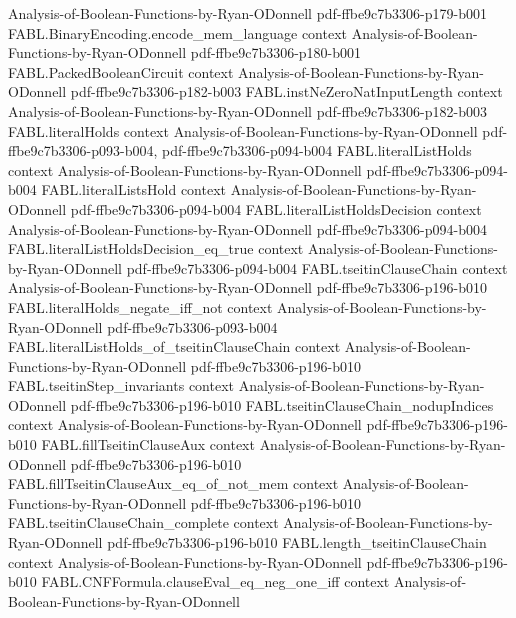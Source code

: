 \begin{theorem}
  {Analysis-of-Boolean-Functions-by-Ryan-ODonnell}
  {pdf-ffbe9c7b3306-p179-b001}
\proofstep
  {FABL.BinaryEncoding.encode_mem_language}
  {context}
  {Analysis-of-Boolean-Functions-by-Ryan-ODonnell}
  {pdf-ffbe9c7b3306-p180-b001}
\proofstep
  {FABL.PackedBooleanCircuit}
  {context}
  {Analysis-of-Boolean-Functions-by-Ryan-ODonnell}
  {pdf-ffbe9c7b3306-p182-b003}
\proofstep
  {FABL.instNeZeroNatInputLength}
  {context}
  {Analysis-of-Boolean-Functions-by-Ryan-ODonnell}
  {pdf-ffbe9c7b3306-p182-b003}
\proofstep
  {FABL.literalHolds}
  {context}
  {Analysis-of-Boolean-Functions-by-Ryan-ODonnell}
  {pdf-ffbe9c7b3306-p093-b004,
    pdf-ffbe9c7b3306-p094-b004}
\proofstep
  {FABL.literalListHolds}
  {context}
  {Analysis-of-Boolean-Functions-by-Ryan-ODonnell}
  {pdf-ffbe9c7b3306-p094-b004}
\proofstep
  {FABL.literalListsHold}
  {context}
  {Analysis-of-Boolean-Functions-by-Ryan-ODonnell}
  {pdf-ffbe9c7b3306-p094-b004}
\proofstep
  {FABL.literalListHoldsDecision}
  {context}
  {Analysis-of-Boolean-Functions-by-Ryan-ODonnell}
  {pdf-ffbe9c7b3306-p094-b004}
\proofstep
  {FABL.literalListHoldsDecision_eq_true}
  {context}
  {Analysis-of-Boolean-Functions-by-Ryan-ODonnell}
  {pdf-ffbe9c7b3306-p094-b004}
\proofstep
  {FABL.tseitinClauseChain}
  {context}
  {Analysis-of-Boolean-Functions-by-Ryan-ODonnell}
  {pdf-ffbe9c7b3306-p196-b010}
\proofstep
  {FABL.literalHolds_negate_iff_not}
  {context}
  {Analysis-of-Boolean-Functions-by-Ryan-ODonnell}
  {pdf-ffbe9c7b3306-p093-b004}
\proofstep
  {FABL.literalListHolds_of_tseitinClauseChain}
  {context}
  {Analysis-of-Boolean-Functions-by-Ryan-ODonnell}
  {pdf-ffbe9c7b3306-p196-b010}
\proofstep
  {FABL.tseitinStep_invariants}
  {context}
  {Analysis-of-Boolean-Functions-by-Ryan-ODonnell}
  {pdf-ffbe9c7b3306-p196-b010}
\proofstep
  {FABL.tseitinClauseChain_nodupIndices}
  {context}
  {Analysis-of-Boolean-Functions-by-Ryan-ODonnell}
  {pdf-ffbe9c7b3306-p196-b010}
\proofstep
  {FABL.fillTseitinClauseAux}
  {context}
  {Analysis-of-Boolean-Functions-by-Ryan-ODonnell}
  {pdf-ffbe9c7b3306-p196-b010}
\proofstep
  {FABL.fillTseitinClauseAux_eq_of_not_mem}
  {context}
  {Analysis-of-Boolean-Functions-by-Ryan-ODonnell}
  {pdf-ffbe9c7b3306-p196-b010}
\proofstep
  {FABL.tseitinClauseChain_complete}
  {context}
  {Analysis-of-Boolean-Functions-by-Ryan-ODonnell}
  {pdf-ffbe9c7b3306-p196-b010}
\proofstep
  {FABL.length_tseitinClauseChain}
  {context}
  {Analysis-of-Boolean-Functions-by-Ryan-ODonnell}
  {pdf-ffbe9c7b3306-p196-b010}
\proofstep
  {FABL.CNFFormula.clauseEval_eq_neg_one_iff}
  {context}
  {Analysis-of-Boolean-Functions-by-Ryan-ODonnell}

\end{theorem}
